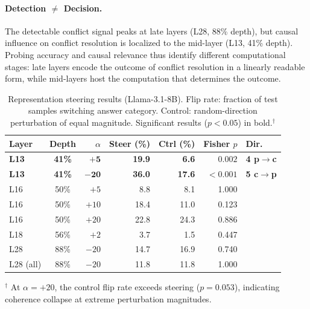 \paragraph{Detection $\neq$ Decision.}
The detectable conflict signal peaks at late layers (L28, 88\% depth), but causal influence on conflict resolution is localized to the mid-layer (L13, 41\% depth).
Probing accuracy and causal relevance thus identify different computational stages: late layers encode the outcome of conflict resolution in a linearly readable form, while mid-layers host the computation that determines the outcome.

\begin{table}[t]
\centering
\caption{Representation steering results (Llama-3.1-8B). Flip rate: fraction of test samples switching answer category. Control: random-direction perturbation of equal magnitude. Significant results ($p < 0.05$) in bold.$^{\dagger}$}
\label{tab:steering}
\small
\begin{tabular}{lcrrrrl}
\toprule
Layer & Depth & $\alpha$ & Steer (\%) & Ctrl (\%) & Fisher $p$ & Dir. \\
\midrule
\textbf{L13} & \textbf{41\%} & $\mathbf{+5}$ & \textbf{19.9} & \textbf{6.6} & $\mathbf{0.002}$ & \textbf{4 p$\to$c} \\
\textbf{L13} & \textbf{41\%} & $\mathbf{-20}$ & \textbf{36.0} & \textbf{17.6} & $\mathbf{<0.001}$ & \textbf{5 c$\to$p} \\
L16 & 50\% & $+5$ & 8.8 & 8.1 & 1.000 & \\
L16 & 50\% & $+10$ & 18.4 & 11.0 & 0.123 & \\
L16 & 50\% & $+20$ & 22.8 & 24.3 & 0.886 & \\
L18 & 56\% & $+2$ & 3.7 & 1.5 & 0.447 & \\
L28 & 88\% & $-20$ & 14.7 & 16.9 & 0.740 & \\
L28 (all) & 88\% & $-20$ & 11.8 & 11.8 & 1.000 & \\
\bottomrule
\end{tabular}
\begin{flushleft}
\footnotesize $^{\dagger}$ At $\alpha = +20$, the control flip rate exceeds steering ($p = 0.053$), indicating coherence collapse at extreme perturbation magnitudes.
\end{flushleft}
\end{table}
